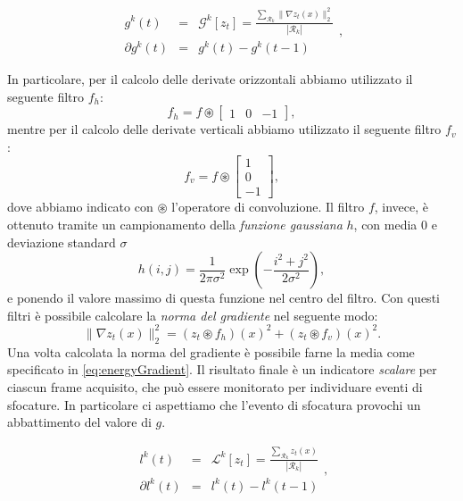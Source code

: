 \documentclass{llncs}
\begin{document}
\begin{equation}
\label{eq:gradientRegions}
\begin{array}{ccc}
g^k(t)&  = & \mathcal{G}^k[z_t] = \frac{\sum_{\mathcal{R}_k}\| \nabla z_t(x) \| _2^2 }{|{\mathcal{R}_k}|}\\
\partial g^k(t) & =& g^k(t)-g^k(t-1) 
\end{array},
\end{equation}

In particolare, per il calcolo delle derivate orizzontali  abbiamo utilizzato il seguente filtro $f_h$:
\[f_h = f \circledast \left[ \begin{array}{rcl}
1 & 0 & -1
\end{array}\right], \] 
mentre per il calcolo delle derivate verticali abbiamo utilizzato il seguente filtro $f_v$:
\[f_v = f \circledast \left[ \begin{array}{r}
1 \\ 0 \\ -1
\end{array}\right], \]
dove abbiamo indicato con $\circledast$ l'operatore di convoluzione.
Il filtro $f$, invece, \`e ottenuto tramite un campionamento della \textit{funzione gaussiana} $h$, con media $0$ e deviazione standard $\sigma$
\begin{equation}
\label{eq:gaussian}
h(i,j)=\frac{1}{2\pi\sigma^2}\exp\left(-\frac{i^2+j^2}{2\sigma^2}\right),
\end{equation}
e ponendo il valore massimo di questa funzione nel centro del filtro.
Con questi filtri \`e possibile calcolare la \textit{norma del gradiente} nel seguente modo:
\begin{equation}
\label{eq:normaGradiente}
\| \nabla z_t(x) \|_2^2=\left(z_t \circledast f_h\right)(x)^2 + \left(z_t \circledast f_v\right)(x)^2.
\end{equation}
Una volta calcolata la norma del gradiente \`e possibile farne la media come specificato in \eqref{eq:energyGradient}.
Il risultato finale \`e un indicatore \textit{scalare} per ciascun frame acquisito, che pu\`o essere monitorato per individuare eventi di sfocature. 
In particolare ci aspettiamo che l'evento di sfocatura provochi un abbattimento del valore di $g$.



\begin{equation}
\label{eq:lumaRegions}
\begin{array}{ccc}
l^k(t)&  = & \mathcal{L}^k[z_t] = \frac{\sum_{\mathcal{R}_k} z_t(x) }{|{\mathcal{R}_k}|}\\
\partial l^k(t) & =& l^k(t)-l^k(t-1) 
\end{array},
\end{equation}
\end{document}
